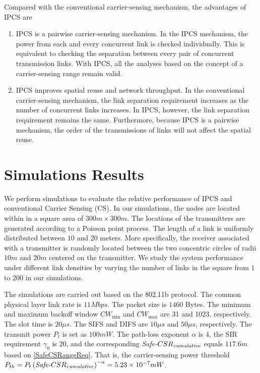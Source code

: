 \documentclass[conference]{IEEEtran}
\begin{document}
Compared with the conventional carrier-sensing mechanism, the
advantages of IPCS are
\begin{enumerate}
\item{IPCS is a pairwise carrier-sensing mechanism.
In the IPCS mechanism, the power from each and every concurrent link
is checked individually. This is equivalent to checking the
separation between every pair of concurrent transmission links. With
IPCS, all the analyses based on the concept of a carrier-sensing
range remain valid.}
\item{IPCS improves spatial reuse and network
throughput. In the conventional carrier-sensing mechanism, the link
separation requirement increases as the number of concurrent links
increases. In IPCS, however, the link separation requirement remains
the same. Furthermore, because IPCS is a pairwise mechanism, the
order of the transmissions of links will not affect the spatial
reuse.}
\end{enumerate}



\section{Simulations Results}\label{simulation}







We perform simulations to evaluate the relative performance of IPCS
and conventional Carrier Sensing (CS). In our simulations, the nodes
are located within in a square area of $300m \times 300m$. The
locations of the transmitters are generated according to a Poisson
point process. The length of a link is uniformly distributed between
$10$ and $20$ meters. More specif\/ically, the receiver associated
with a transmitter is randomly located between the two concentric
circles of radii $10m$ and $20m$ centered on the transmitter. We
study the system performance under different link densities by
varying the number of links in the square from $1$ to $200$ in our
simulations.



The simulations are carried out based on the 802.11b protocol. The
common physical layer link rate is $11Mbps$. The packet size is
$1460$ Bytes. The minimum and maximum backoff window $CW_{\min}$ and
$CW_{\max}$ are 31 and 1023, respectively. The slot time is $20\mu
s$. The SIFS and DIFS are $10\mu s$ and $50\mu s $, respectively.
The transmit power $P_t$ is set as $100mW$. The path-loss exponent
$\alpha$ is $4$, the SIR requirement $\gamma_0$ is $20$, and the
corresponding \emph{Safe-}$CSR_\text{\emph{cumulative}}$ equals
$117.6m$ based on \eqref{SafeCSRangeReq}. That is, the
carrier-sensing power threshold
$P_{th}=P_t\left(\text{\emph{Safe-}}CSR_\text{\emph{cumulative}}\right)^{-\alpha}
=5.23\times10^{-7}mW$.
\end{document}
